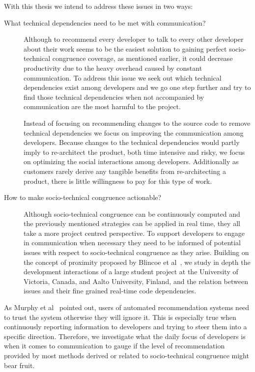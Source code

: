 With this thesis we intend to address these issues in two ways:
\begin{description}
\item[What technical dependencies need to be met with communication?] 
Although to recommend every developer to talk to every other developer about their work seems to be the easiest solution to gaining perfect socio-technical congruence coverage, as mentioned earlier, it could decrease productivity due to the heavy overhead caused by  constant communication.
To address this issue we seek out which technical dependencies exist among developers and we go one step further and try to find those technical dependencies when not accompanied by communication are the most harmful to the project.

Instead of focusing on recommending changes to the source code to remove technical dependencies we focus on improving the communication among developers.
Because changes to the technical dependencies would partly imply to re-architect the product, both time intensive and risky, we focus on optimizing the social interactions among developers.
Additionally as customers rarely derive any tangible benefits from re-architecting a product, there is little willingness to pay for this type of work.

\item[How to make socio-technical congruence actionable?] Although socio-technical congruence can be continuously computed and the previously mentioned strategies can be applied in real time, they all take a more project centred perspective.
To support developers to engage in communication when necessary they need to be informed of potential issues with respect to socio-technical congruence as they arise.
Building on the concept of proximity proposed by Blincoe et al~\cite{blincoe:cscw:2012}, we study in depth the development interactions of a large student project at the University of Victoria, Canada, and Aalto University, Finland, and the relation between issues and their fine grained real-time code dependencies.
\end{description}

As Murphy et al~\cite{murphy:rsse:2010} pointed out, users of automated recommendation systems need to trust the system otherwise they will ignore it.
This is especially true when continuously reporting information to developers and trying to steer them into a specific direction.
Therefore, we investigate what the daily focus of developers is when it comes to communication to gauge if the level of recommendation provided by most methods derived or related to socio-technical congruence might bear fruit.

